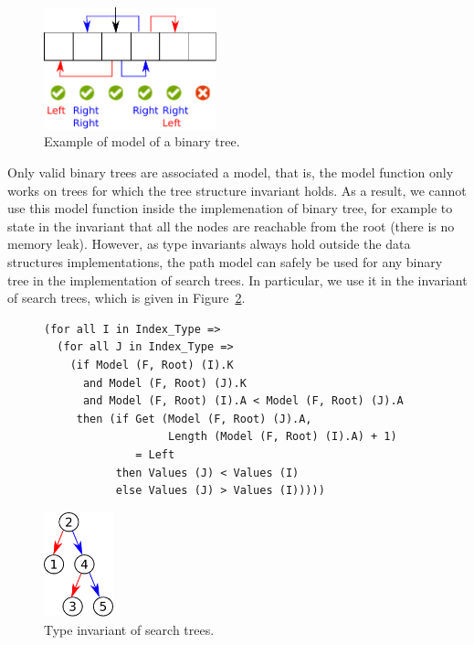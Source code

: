 \documentclass{llncs}
\begin{document}
\begin{figure}[ht]
\begin{center}
\includegraphics[width=5cm]{model.pdf}
\caption{\label{fig-binary-mod-ex} Example of model of a binary tree.}
\end{center}
\end{figure}

Only valid binary trees are associated a model, that is, the model function
only works on trees for which the tree structure invariant holds. As a result,
we cannot use this model function inside the implemenation of binary tree,
for example to state in the invariant that all the nodes are reachable from the
root (there is no memory leak). However, as type invariants always hold outside
the data structures implementations, the path model can safely be used for any
binary tree in the implementation of search trees. In particular, we use it
in the invariant of search trees, which is given in Figure~\ref{fig-search}.

\begin{figure}[ht]
\hspace{-2mm}
\begin{minipage}[c]{.78\linewidth}
\begin{small}
\begin{lstlisting}
(for all I in Index_Type =>
  (for all J in Index_Type =>
    (if Model (F, Root) (I).K
      and Model (F, Root) (J).K
      and Model (F, Root) (I).A < Model (F, Root) (J).A
     then (if Get (Model (F, Root) (J).A,
                   Length (Model (F, Root) (I).A) + 1)
              = Left
           then Values (J) < Values (I)
           else Values (J) > Values (I)))))
\end{lstlisting}
\end{small}
\end{minipage}
\begin{minipage}[c]{.22\linewidth}
\begin{center}
\includegraphics[width=2cm]{search.pdf}
\end{center}
\end{minipage}
\caption{\label{fig-search} Type invariant of search trees.}
\end{figure}
\end{document}
